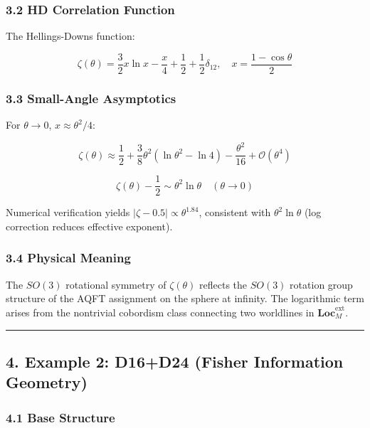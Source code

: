 \documentclass[
]{article}
\begin{document}
\subsubsection{3.2 HD Correlation
Function}\label{hd-correlation-function}

The Hellings-Downs function:

\[\zeta(\theta) = \frac{3}{2} x \ln x - \frac{x}{4} + \frac{1}{2} + \frac{1}{2}\delta_{12}, \quad x = \frac{1 - \cos\theta}{2}\]

\subsubsection{3.3 Small-Angle
Asymptotics}\label{small-angle-asymptotics}

For \(\theta \to 0\), \(x \approx \theta^2/4\):

\[\zeta(\theta) \approx \frac{1}{2} + \frac{3}{8}\theta^2(\ln \theta^2 - \ln 4) - \frac{\theta^2}{16} + \mathcal{O}(\theta^4)\]

\[\zeta(\theta) - \frac{1}{2} \sim \theta^2 \ln \theta \quad (\theta \to 0)\]

Numerical verification yields \(|\zeta - 0.5| \propto \theta^{1.84}\),
consistent with \(\theta^2 \ln\theta\) (log correction reduces effective
exponent).

\subsubsection{3.4 Physical Meaning}\label{physical-meaning}

The \(SO(3)\) rotational symmetry of \(\zeta(\theta)\) reflects the
\(SO(3)\) rotation group structure of the AQFT assignment on the sphere
at infinity. The logarithmic term arises from the nontrivial cobordism
class connecting two worldlines in \(\mathbf{Loc}_M^{\text{ext}}\).

\begin{center}\rule{0.5\linewidth}{0.5pt}\end{center}

\subsection{4. Example 2: D16+D24 (Fisher Information
Geometry)}\label{example-2-d16d24-fisher-information-geometry}

\subsubsection{4.1 Base Structure}\label{base-structure-1}
\end{document}
